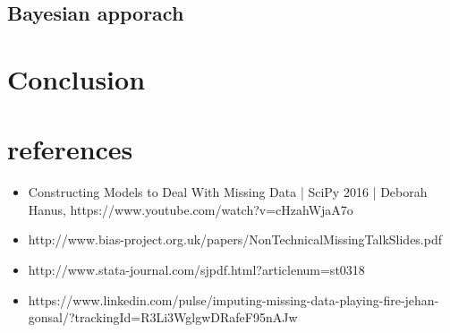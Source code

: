 \documentclass{beamer}
\begin{document}
\subsection{Bayesian apporach}
\begin{frame}
\end{frame}

\section{Conclusion}
\begin{frame}
\end{frame}

\section{references}
\begin{frame}
	\begin{itemize}
		\item Constructing Models to Deal With Missing Data | SciPy 2016 | Deborah Hanus, https://www.youtube.com/watch?v=cHzahWjaA7o
                \item http://www.bias-project.org.uk/papers/NonTechnicalMissingTalkSlides.pdf
                \item http://www.stata-journal.com/sjpdf.html?articlenum=st0318
                \item https://www.linkedin.com/pulse/imputing-missing-data-playing-fire-jehan-gonsal/?trackingId=R3Li3WglgwDRafeF95nAJw%
	\end{itemize}
\end{frame}
\end{document}
